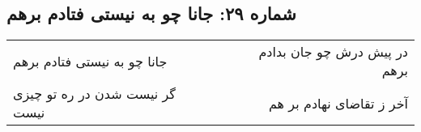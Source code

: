 \begin{center}
\section*{شماره ۲۹: جانا چو به نیستی فتادم برهم}
\label{sec:029}
\begin{longtable}{l p{0.5cm} r}
جانا چو به نیستی فتادم برهم
&&
در پیش درش چو جان بدادم برهم
\\
گر نیست شدن در ره تو چیزی نیست
&&
آخر ز تقاضای نهادم بر هم
\\
\end{longtable}
\end{center}
